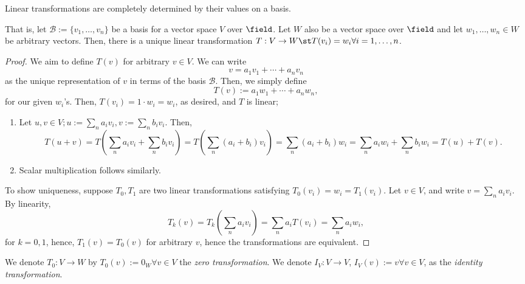 \begin{theorem}\label{thm:basisdeteremineslineartransformation}
    Linear transformations are completely determined by their values on a basis. 
    
    That is, let $\mathcal{B} := \{v_1, \dots, v_n\}$ be a basis for a vector space $V$ over $\field$. Let $W$ also be a vector space over $\field$ and let $w_1, \dots, w_n \in W$ be arbitrary vectors. Then, there is a unique linear transformation $T : V \to W \st T(v_i) = w_i \forall i = 1, \dots, n$.
\end{theorem}

\begin{proof}
    We aim to define $T(v)$ for arbitrary $v \in V$. We can write \[
    v = a_1 v_1 + \cdots + a_n v_n    
    \]
    as the unique representation of $v$ in terms of the basis $\mathcal{B}$. Then, we simply define \[
        T(v) := a_1 w_1 + \cdots + a_n w_n,
    \]
    for our given $w_i$'s. Then, $T(v_i) = 1 \cdot w_i = w_i$, as desired, and $T$ is linear; \begin{enumerate}
        \item Let $u, v \in V; u := \sum_{n} a_i v_i, v:= \sum_{n} b_i v_i$. Then, \[
        T(u + v) = T(\sum_{n} a_i v_i+\sum_{n} b_i v_i) = T(\sum_n(a_i + b_i) v_i)   =\sum_n (a_i + b_i) w_i =  \sum_{n} a_i w_i + \sum_{n} b_i w_i = T(u) + T(v).
        \]
        \item Scalar multiplication follows similarly.
    \end{enumerate}

    To show uniqueness, suppose $T_0, T_1$ are two linear transformations satisfying $T_0(v_i) = w_i = T_1(v_i)$. Let $v \in V$, and write $v = \sum_{n} a_i v_i$. By linearity, \[
    T_k (v) = T_k(\sum_n a_i v_i) = \sum_n a_i T(v_i) = \sum_n a_i w_i,    
    \]
    for $k = 0, 1$, hence, $T_1(v) = T_0(v)$ for arbitrary $v$, hence the transformations are equivalent.
\end{proof}

\begin{definition}
    We denote $T_0: V \to W$ by $T_0(v) := 0_W \forall v \in V$ the \emph{zero transformation}. We denote $I_V : V \to V$, $I_V(v) := v \forall v \in V$, as the \emph{identity transformation}.
\end{definition}